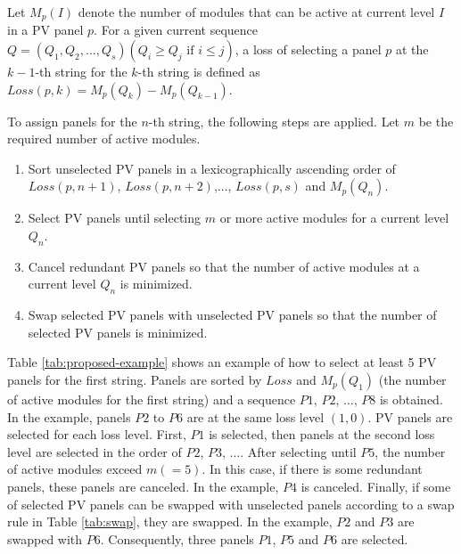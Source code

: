 \documentclass[conference]{IEEEtran}
\begin{document}
Let $M_{p}(I)$ denote the number of modules that can be active at current level $I$ in a PV panel $p$. 
For a given current sequence $Q = (Q_{1},Q_{2},\ldots ,Q_{s}) (Q_{i} \geq Q_{j} \mbox{\ if\ } i \leq j)$, 
a loss of selecting a panel $p$ at the $k-1$-th string for the $k$-th string is defined as 
$Loss(p,k) = M_{p}(Q_{k}) - M_{p}(Q_{k-1})$. 

%

To assign panels for the $n$-th string, the following steps are applied. Let $m$ be the required number of active modules.
\begin{enumerate}
\item Sort unselected PV panels in a lexicographically ascending order of $Loss(p,n+1)$, $Loss(p,n+2)$,$\ldots$, $Loss(p,s)$ and $M_{p}(Q_{n})$.
\item Select PV panels until selecting $m$ or more active modules for a current level $Q_{n}$.
\item Cancel redundant PV panels so that the number of active modules at a current level $Q_{n}$ is minimized.
\item Swap selected PV panels with unselected PV panels so that the number of selected PV panels is minimized.
\end{enumerate}

Table \ref{tab:proposed-example} shows an example of how to select at least 5 PV panels for the first string. 
Panels are sorted by $Loss$ and $M_{p}(Q_{1})$ (the number of active modules for the first string) and a sequence $P1$, $P2$, $\ldots$, $P8$ is obtained. 
In the example, panels $P2$ to $P6$ are at the same loss level $(1,0)$. 
PV panels are selected for each loss level. First, $P1$ is selected, then panels at the second loss level are selected in the order of $P2$, $P3$, $\ldots$. After selecting until $P5$, the number of active modules exceed $m (=5)$. In this case, if there is some redundant panels, these panels are canceled. In the example, $P4$ is canceled. Finally, if some of selected PV panels can be swapped with unselected panels according to a swap rule in Table \ref{tab:swap}, they are swapped. In the example, $P2$ and $P3$ are swapped with $P6$. Consequently, three panels $P1$, $P5$ and $P6$ are selected. 
\end{document}
